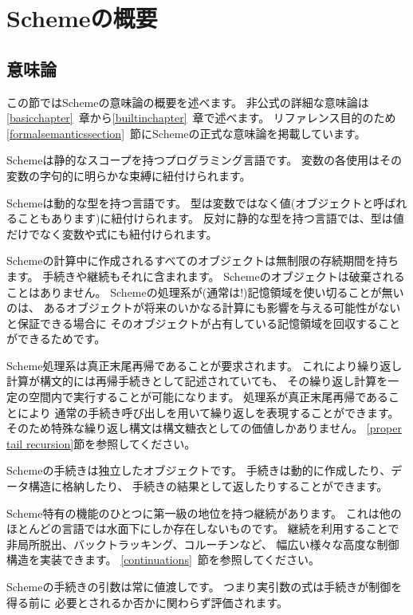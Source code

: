 
\chapter{Schemeの概要}

\section{意味論}
\label{semanticsection}

この節ではSchemeの意味論の概要を述べます。
非公式の詳細な意味論は\ref{basicchapter}~章から\ref{builtinchapter}~章で述べます。
リファレンス目的のため
\ref{formalsemanticssection}~節にSchemeの正式な意味論を掲載しています。

\vest Schemeは静的なスコープを持つプログラミング言語です。
変数の各使用はその変数の字句的に明らかな束縛に紐付けられます。

\vest Schemeは動的な型を持つ言語です。
型は変数ではなく値(オブジェクトと呼ばれることもあります)に紐付けられます。
反対に静的な型を持つ言語では、型は値だけでなく変数や式にも紐付けられます。

\vest Schemeの計算中に作成されるすべてのオブジェクトは無制限の存続期間を持ちます。
手続きや継続もそれに含まれます。
Schemeのオブジェクトは破棄されることはありません。
Schemeの処理系が(通常は!)記憶領域を使い切ることが無いのは、
あるオブジェクトが将来のいかなる計算にも影響を与える可能性がないと保証できる場合に
そのオブジェクトが占有している記憶領域を回収することができるためです。

\vest Scheme処理系は真正末尾再帰であることが要求されます。
これにより繰り返し計算が構文的には再帰手続きとして記述されていても、
その繰り返し計算を一定の空間内で実行することが可能になります。
処理系が真正末尾再帰であることにより
通常の手続き呼び出しを用いて繰り返しを表現することができます。
そのため特殊な繰り返し構文は構文糖衣としての価値しかありません。
\ref{proper tail recursion}節を参照してください。

\vest Schemeの手続きは独立したオブジェクトです。
手続きは動的に作成したり、データ構造に格納したり、
手続きの結果として返したりすることができます。

\vest Scheme特有の機能のひとつに第一級の地位を持つ継続があります。
これは他のほとんどの言語では水面下にしか存在しないものです。
継続を利用することで非局所脱出、バックトラッキング、コルーチンなど、
幅広い様々な高度な制御構造を実装できます。
\ref{continuations}~節を参照してください。

\vest Schemeの手続きの引数は常に値渡しです。
つまり実引数の式は手続きが制御を得る前に
必要とされるか否かに関わらず評価されます。

